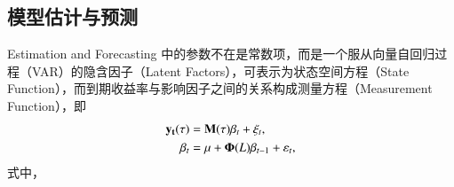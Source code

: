 
\subsection{模型估计与预测}{Estimation and Forecasting}
\dns 中的参数不在是常数项，而是一个服从向量自回归过程（VAR）的隐含因子（Latent Factors），可表示为状态空间方程（State Function），而到期收益率与影响因子之间的关系构成测量方程（Measurement Function），即
\begin{align}
\mathbf{y_t(\tau)} &= \mathcal{\mathbf{M}}(\mathbf{\tau}) \mathbf{\beta}_t  + \mathbf{\xi}_t, \\
\mathbf{\beta}_t &= \mathbf{\mu} + \mathbf{\Phi}(L)\mathbf{\beta}_{t-1} + \mathbf{\varepsilon}_t,
\end{align}
式中，
